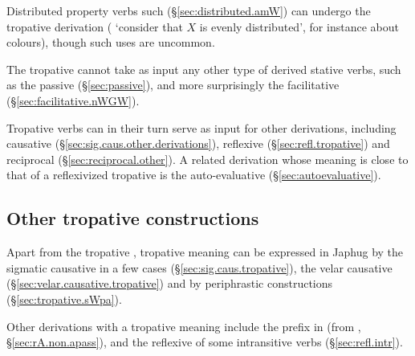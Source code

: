 Distributed property verbs such  (§\ref{sec:distributed.amW}) can undergo the tropative derivation ( `consider that $X$ is evenly distributed', for instance about colours), though such uses are uncommon.

The tropative cannot take as input any other type of derived stative verbs, such as the passive (§\ref{sec:passive}), and more surprisingly the  facilitative (§\ref{sec:facilitative.nWGW}).

Tropative verbs can in their turn serve as input for other derivations, including causative (§\ref{sec:sig.caus.other.derivations}), reflexive (§\ref{sec:refl.tropative}) and reciprocal (§\ref{sec:reciprocal.other}). A related derivation whose meaning is close to that of a reflexivized tropative is the auto-eva\-lua\-tive  (§\ref{sec:autoevaluative}).

\subsection{Other tropative constructions}  \label{sec:tropative.other.construction}
 
Apart from the tropative , tropative meaning can be expressed in Japhug by the sigmatic causative in a few cases (§\ref{sec:sig.caus.tropative}), the velar causative (§\ref{sec:velar.causative.tropative}) and by periphrastic constructions (§\ref{sec:tropative.sWpa}). 

Other derivations with a tropative meaning include the  prefix in  (from , §\ref{sec:rA.non.apass}), and the reflexive   of some intransitive verbs (§\ref{sec:refl.intr}).
